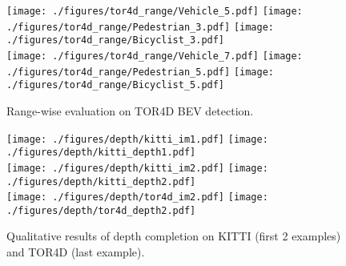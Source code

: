 \documentclass[10pt,twocolumn,letterpaper]{article}
\begin{document}
\begin{figure*}[t]
\begin{center}
\texttt{[image: ./figures/tor4d\_range/Vehicle\_5.pdf]} \texttt{[image: ./figures/tor4d\_range/Pedestrian\_3.pdf]} \texttt{[image: ./figures/tor4d\_range/Bicyclist\_3.pdf]}\\
\texttt{[image: ./figures/tor4d\_range/Vehicle\_7.pdf]} \texttt{[image: ./figures/tor4d\_range/Pedestrian\_5.pdf]} \texttt{[image: ./figures/tor4d\_range/Bicyclist\_5.pdf]}
\end{center}
   \caption{Range-wise evaluation on TOR4D BEV detection.}
\label{fig:tor4d_range}
\end{figure*}


\begin{figure*}[t]
\begin{center}
\texttt{[image: ./figures/depth/kitti\_im1.pdf]}
\texttt{[image: ./figures/depth/kitti\_depth1.pdf]}\\
\texttt{[image: ./figures/depth/kitti\_im2.pdf]}
\texttt{[image: ./figures/depth/kitti\_depth2.pdf]}\\
\texttt{[image: ./figures/depth/tor4d\_im2.pdf]}
\texttt{[image: ./figures/depth/tor4d\_depth2.pdf]}\\
\end{center}
   \caption{Qualitative results of depth completion on KITTI (first 2 examples) and TOR4D (last example).}
\label{fig:depth}
\end{figure*}
 
\end{document}

